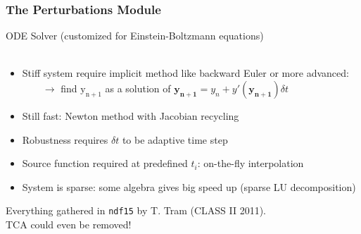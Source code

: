 \begin{frame}[fragile]
	\frametitle{The Perturbations Module}
	
	ODE Solver (customized for Einstein-Boltzmann equations)\\
	\mbox{}\\
	\begin{itemize}
		\item Stiff system require implicit method like backward Euler or more advanced:\\
		~~~~$\rightarrow$ find $\mathrm{y_{n+1}}$ as a solution of $\mathbf{y_{n+1}} = y_n + y'(\mathbf{y_{n+1}}) \delta t$
		\item Still fast: Newton method with Jacobian recycling 
		\item Robustness requires $\delta t$ to be adaptive time step
		\item Source function required at predefined $t_i$: on-the-fly interpolation
		\item System is sparse: some algebra gives big speed up (sparse LU decomposition)
	\end{itemize}
	Everything gathered in {\tt ndf15} by T. Tram (CLASS II 2011).\\ TCA could even be removed!
\end{frame}


